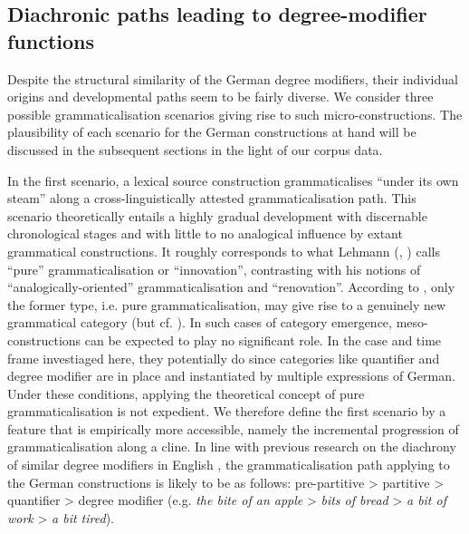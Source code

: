 \documentclass[output=paper]{langsci/langscibook}
\begin{document}
\subsection{Diachronic paths leading to degree\hyp{}modifier functions} \label{sec3-2}

Despite the structural similarity of the German degree modifiers, their individual origins and developmental paths seem to be fairly diverse. We consider three possible grammaticalisation scenarios giving rise to such micro\hyp{}constructions. The plausibility of each scenario for the German constructions at hand will be discussed in the subsequent sections in the light of our corpus data.

\begin{sloppypar}
In the first scenario, a lexical source construction grammaticalises “under its own steam” along a cross-linguistically attested grammaticalisation path. This scenario theoretically entails a highly gradual development with discernable chronological stages and with little to no analogical influence by extant grammatical constructions. It roughly corresponds to what Lehmann (\citeyear{Lehmann2004a}, \citeyear{LehmannThoughtsGrammaticalization2015})  calls “pure” grammaticalisation or “innovation”, contrasting with his notions of “analogically-oriented” grammaticalisation and “renovation”. According to \citet[e.g.][161]{Lehmann2004a}, only the former type, i.e. pure grammaticalisation, may give rise to a genuinely new grammatical category (but cf. \citealt[Section 4.1]{DeSmetDoesinnovationneed2014}). In such cases of category emergence, meso\hyp{}constructions can be expected to play no significant role. In the case and time frame investiaged here, they potentially do since categories like quantifier and degree modifier are in place and instantiated by multiple expressions of German. Under these conditions, applying the theoretical concept of pure grammaticalisation is not expedient. We therefore define the first scenario by a feature that is empirically more accessible, namely the incremental progression of grammaticalisation along a cline. In line with previous research on the diachrony of similar degree modifiers in English \citep[esp.][]{TraugottGrammaticalizationConstructionsIncremental2008, TraugottGrammaticalizationNPNP2008}, the grammaticalisation path applying to the German constructions is likely to be as follows: pre-partitive > partitive > quantifier > degree modifier (e.g. \textit{the bite of an apple} > \textit{bits of bread} > \textit{a bit of work} > \textit{a bit tired}).
\end{sloppypar} 
\end{document}
